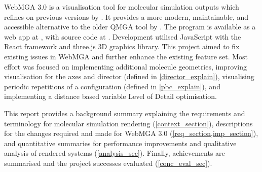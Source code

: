WebMGA 3.0 is a visualisation tool for molecular simulation outputs which refines on previous versions by \textcite{Battistini_2021,webmga_2}. It provides a more modern, maintainable, and accessible alternative to the older QMGA tool by \textcite{gabriel2008molecular}. The program is available as a web app at , with source code at . Development utilised JavaScript with the React\cite{react} framework and three.js\cite{three} 3D graphics library. This project aimed to fix existing issues in WebMGA and further enhance the existing feature set. Most effort was focused on implementing additional molecule geometries, improving visualisation for the axes and director (defined in \cref{director_explain}), visualising periodic repetitions of a configuration (defined in \cref{pbc_explain}), and implementing a distance based variable Level of Detail optimisation.

This report provides a background summary explaining the requirements and terminology for molecular simulation rendering (\cref{context_section}), descriptions for the changes required and made for WebMGA 3.0 (\cref{req_section,imp_section}), and quantitative summaries for performance improvements and qualitative analysis of rendered systems (\cref{analysis_sec}). Finally, achievements are summarised and the project successes evaluated (\cref{conc_eval_sec}).

